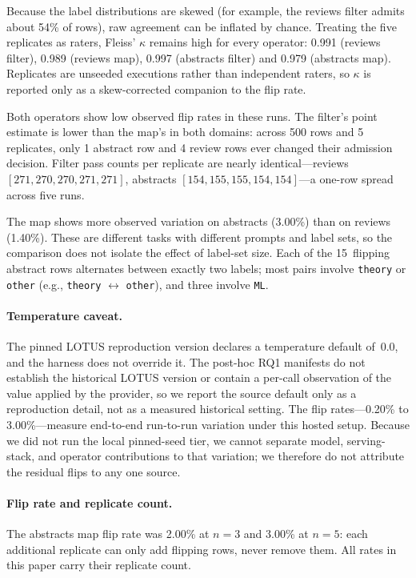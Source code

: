 \documentclass[11pt]{article}
\begin{document}
Because the label distributions are skewed (for example, the reviews filter
admits about 54\% of rows), raw agreement can be inflated by chance. Treating
the five replicates as raters, Fleiss' $\kappa$ remains high for every operator:
0.991 (reviews filter), 0.989 (reviews map), 0.997 (abstracts filter) and 0.979
(abstracts map). Replicates are unseeded executions rather than independent
raters, so $\kappa$ is reported only as a skew-corrected companion to the flip
rate.

Both operators show low observed flip rates in these runs. The filter's
point estimate is lower than the map's in both domains: across 500 rows and
5 replicates, only 1 abstract row and 4 review rows ever changed their
admission decision. Filter pass
counts per replicate are nearly identical---reviews
$[271, 270, 270, 271, 271]$, abstracts $[154, 155, 155, 154, 154]$---a
one-row spread across five runs.

The map shows more observed variation on abstracts (3.00\%) than on reviews
(1.40\%). These are different tasks with different prompts and label sets, so
the comparison does not isolate the effect of label-set size. Each of the
15~flipping abstract rows alternates between exactly two labels; most pairs
involve \texttt{theory} or \texttt{other} (e.g., \texttt{theory}
$\leftrightarrow$ \texttt{other}), and three involve \texttt{ML}.

\paragraph{Temperature caveat.}
The pinned LOTUS reproduction version declares a temperature default of~0.0,
and the harness does not override it. The post-hoc RQ1 manifests do not
establish the historical LOTUS version or contain a per-call observation of
the value applied by the provider, so we report the source default only as a
reproduction detail, not as a measured historical setting.
The flip rates---0.20\% to 3.00\%---measure end-to-end run-to-run variation
under this hosted setup.  Because we did not run the local pinned-seed tier,
we cannot separate model, serving-stack, and operator contributions to that
variation; we therefore do not attribute the residual flips to any one
source.

\paragraph{Flip rate and replicate count.}
The abstracts map flip rate was 2.00\% at $n=3$ and 3.00\% at $n=5$:
each additional replicate can only add flipping rows, never remove them.
All rates in this paper carry their replicate count.
\end{document}
